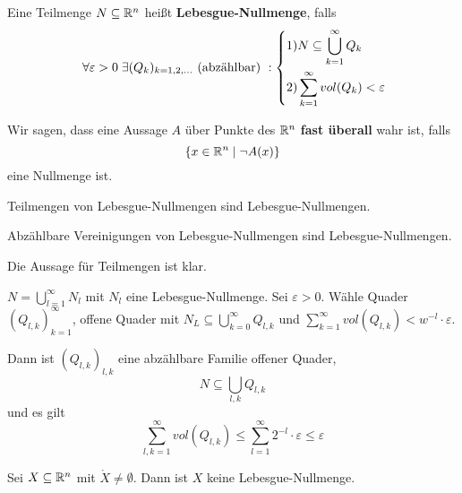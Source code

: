 \documentclass[main.tex]{subfiles}
\begin{document}
\begin{Definition}[Nullmengen]
  Eine Teilmenge $N \subseteq \mathbb{R}^n$ heißt \textbf{Lebesgue-Nullmenge}, falls
  $$\;\forall \varepsilon > 0 \;\exists (Q_k)_{k = 1,2,...} \text{ (abzählbar) } : \left\{\begin{aligned}
    1) & N \subseteq \bigcup_{k=1}^\infty Q_k \\
    2) & \sum \limits_{k=1}^\infty vol(Q_k) < \varepsilon
  \end{aligned}\right.$$

  Wir sagen, dass eine Aussage $A$ über Punkte des $\mathbb{R}^n$ \textbf{fast überall} wahr ist, falls
  $$\{x \in \mathbb{R}^n \mid \lnot A(x)\}$$
  eine Nullmenge ist.
\end{Definition}

\begin{Lemma}
  Teilmengen von Lebesgue-Nullmengen sind Lebesgue-Nullmengen.

  Abzählbare Vereinigungen von Lebesgue-Nullmengen sind Lebesgue-Nullmengen.
\end{Lemma}

\begin{Beweis}
  Die Aussage für Teilmengen ist klar.

  $N = \bigcup_{l=1}^\infty N_l$ mit $N_l$ eine Lebesgue-Nullmenge.
  Sei $\varepsilon > 0$. Wähle Quader $(Q_{l,k})_{k=1}^\infty$, offene Quader mit $N_L \subseteq \bigcup_{k=0}^\infty Q_{l,k}$ und
  $\sum \limits_{k=1}^\infty vol(Q_{l,k}) < w^{-l}\cdot \varepsilon$.

  Dann ist $(Q_{l,k})_{l,k}$ eine abzählbare Familie offener Quader,
  $$N \subseteq \bigcup_{l,k} Q_{l,k}$$
  und es gilt
  $$\sum \limits_{l,k = 1}^\infty vol(Q_{l,k}) \leq \sum \limits_{l=1}^\infty 2^{-l} \cdot \varepsilon \leq \varepsilon$$
\end{Beweis}

\begin{Theorem}
  Sei $X \subseteq \mathbb{R}^n$ mit $\mathring{X} \neq \emptyset$. Dann ist $X$ keine Lebesgue-Nullmenge.
\end{Theorem}
\end{document}
